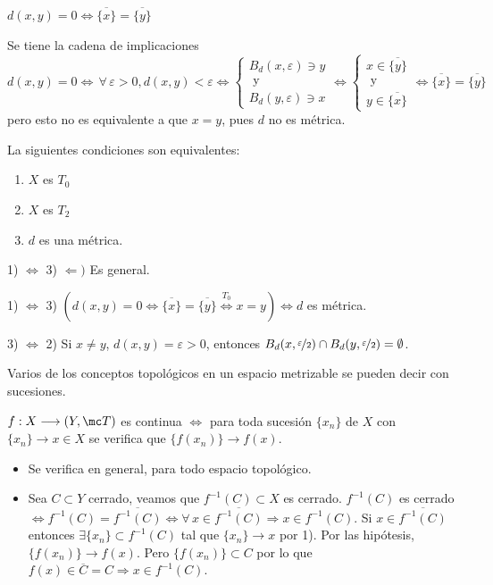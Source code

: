 \begin{propi} $d(x,y) = 0\iff \overline{\{x\}} = \overline{\{y\}}$
\end{propi}
\begin{dem} Se tiene la cadena de implicaciones
    $$d(x,y)=0 \iff \, \forall \,  \varepsilon >0, d(x,y) < \varepsilon  \iff \begin{cases} B_d(x,\varepsilon) \ni y \\[-3mm]  \text{ y } \\[-3mm] B_d(y,\varepsilon) \ni x 
    \end{cases}  \iff \begin{cases}
        x\in \overline{\{y\}} \\[-3mm] \text{ y } \\[-3mm] y \in \overline{\{x\}}
    \end{cases} \iff \overline{\{x\}} = \overline{\{y\}}$$
    pero esto no es equivalente a que $x=y$, pues $d$ no es m\'etrica. 
    \end{dem}
\begin{ejer}[123]
    La siguientes condiciones son equivalentes:
    \begin{enumerate}
        \item $X$ es $T_0$
        \item $X$ es $T_2$
        \item $d$ es una m\'etrica. 
    \end{enumerate}
\end{ejer}
\begin{dem}
    1) $\iff$ 3) $\Leftarrow)$ Es general.

    1) $\iff$ 3) $(d(x,y) = 0 \iff \overline{\{x\}} = \overline{\{y\}} \overset{T_0}{\iff} x=y) \iff d $ es m\'etrica.

    3) $\iff$ 2) Si $x\neq y$, $d(x,y) = \varepsilon >0$, entonces $B_d(x, \nicefrac{\varepsilon}{2}) \cap B_d(y, \nicefrac{\varepsilon}{2}) = \emptyset$.
\end{dem}
Varios de los conceptos topol\'ogicos en un espacio metrizable se pueden decir con sucesiones.
\begin{ejer}
[122] $f: X \longrightarrow (Y, \mc T)$ es continua $\iff$ para toda sucesi\'on $\{x_n\}$ de $X$ con $\{x_n\} \to x \in X$ se verifica que $\{f(x_n)\} \to f(x)$. 
\end{ejer}
\begin{sol}
    \begin{itemize}
        \item[$\Rightarrow)$] Se verifica en general, para todo espacio topol\'ogico.
        \item[$\Leftarrow)$] Sea $C \subset Y$ cerrado, veamos que $f^{-1}(C) \subset X$ es cerrado. $f^{-1}(C)$ es cerrado $\iff f^{-1}(C) = \overline{f^{-1}(C)} \iff \forall \, x\in \overline{f^{-1}(C)} \Rightarrow x\in f^{-1}(C)$. Si $x\in \overline{f^{-1}(C)} $ entonces $\exists \{x_n \} \subset f^{-1}(C)$ tal que $\{x_n\} \to x$ por 1). Por las hip\'otesis, $\{f(x_n)\} \to f(x)$. Pero $\{f(x_n)\} \subset C$ por lo que $f(x) \in \overline{C} = C \Rightarrow x \in f^{-1}(C)$. 
        \end{itemize}
\end{sol}
